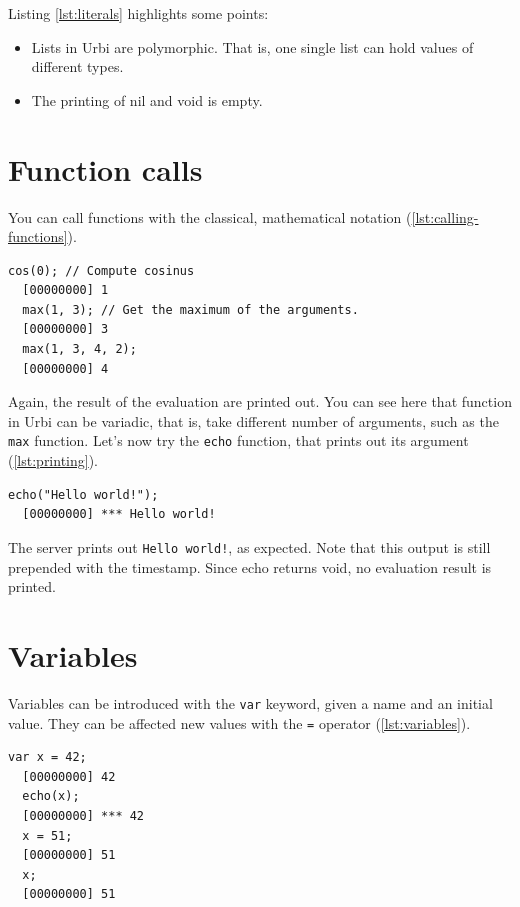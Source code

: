 \documentclass[openright,twoside,12pt]{report}
\newcommand{\urbi}{Urbi\xspace}
\newcommand{\lst}[1]{\autoref{lst:#1}}
\begin{document}
Listing \ref{lst:literals} highlights some points:
\begin{itemize}
\item Lists in \urbi are polymorphic. That is, one single list can
  hold values of different types.
\item The printing of nil and void is empty.
\end{itemize}

\section{Function calls}

You can call functions with the classical, mathematical notation
(\lst{calling-functions}).

\begin{lstlisting}[caption=Calling functions,label=lst:calling-functions]
  cos(0); // Compute cosinus
  [00000000] 1
  max(1, 3); // Get the maximum of the arguments.
  [00000000] 3
  max(1, 3, 4, 2);
  [00000000] 4
\end{lstlisting}

Again, the result of the evaluation are printed out. You can see here
that function in \urbi can be variadic, that is, take different number
of arguments, such as the \texttt{max} function. Let's now try the
\texttt{echo} function, that prints out its argument (\lst{printing}).

\begin{lstlisting}[caption=Printing out,label=lst:printing]
  echo("Hello world!");
  [00000000] *** Hello world!
\end{lstlisting}

The server prints out \texttt{Hello world!}, as expected. Note that
this output is still prepended with the timestamp. Since echo returns
void, no evaluation result is printed.

\section{Variables}

Variables can be introduced with the \texttt{var} keyword, given a
name and an initial value. They can be affected new values with the
\texttt{=} operator (\lst{variables}).

\begin{lstlisting}[caption=Using variables,label=lst:variables]
  var x = 42;
  [00000000] 42
  echo(x);
  [00000000] *** 42
  x = 51;
  [00000000] 51
  x;
  [00000000] 51
\end{lstlisting}
\end{document}
